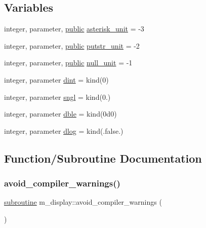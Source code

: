 \subsection*{Variables}
\begin{DoxyCompactItemize}
\item 
integer, parameter, \hyperlink{M__stopwatch_83_8txt_a2f74811300c361e53b430611a7d1769f}{public} \hyperlink{namespacem__display_a9d76146cf157a888cfc94f84a8ec440f}{asterisk\+\_\+unit} = -\/3
\item 
integer, parameter, \hyperlink{M__stopwatch_83_8txt_a2f74811300c361e53b430611a7d1769f}{public} \hyperlink{namespacem__display_a3d9e3532ee7c52476b1d1545b2f73d89}{putstr\+\_\+unit} = -\/2
\item 
integer, parameter, \hyperlink{M__stopwatch_83_8txt_a2f74811300c361e53b430611a7d1769f}{public} \hyperlink{namespacem__display_a19eab1ae2710aecb5e6db7c68152d645}{null\+\_\+unit} = -\/1
\item 
integer, parameter \hyperlink{namespacem__display_a73f772e9702cad6f40b78364fde2c7cd}{dint} = kind(0)
\item 
integer, parameter \hyperlink{namespacem__display_a2ac86bc535c3ccc5947dbb3109c666b5}{sngl} = kind(0.)
\item 
integer, parameter \hyperlink{namespacem__display_a46d90b75b6ccef7ccade133e5847e815}{dble} = kind(0d0)
\item 
integer, parameter \hyperlink{namespacem__display_a8c6a3df510feabf6bc84dd0a8789f98c}{dlog} = kind(.false.)
\end{DoxyCompactItemize}


\subsection{Function/\+Subroutine Documentation}
\mbox{\label{namespacem__display_a6200cf732096469f40c38ec2baa6d811}} 
\subsubsection{\texorpdfstring{avoid\+\_\+compiler\+\_\+warnings()}{avoid\_compiler\_warnings()}}
{\footnotesize\ttfamily \hyperlink{M__stopwatch_83_8txt_acfbcff50169d691ff02d4a123ed70482}{subroutine} m\+\_\+display\+::avoid\+\_\+compiler\+\_\+warnings (\begin{DoxyParamCaption}{ }\end{DoxyParamCaption})\hspace{0.3cm}{\ttfamily [private]}}

